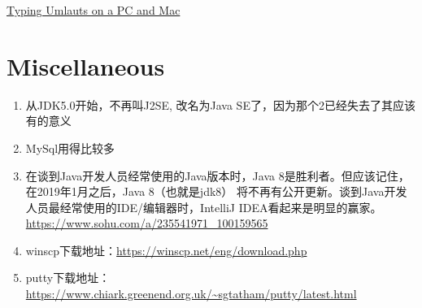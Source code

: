 \documentclass[a4paper, 12pt]{article}
\begin{document}
\href{http://www.nthuleen.com/teach/misc/typingumlauts.html}{Typing Umlauts on a PC and Mac}


\section{Miscellaneous}

\begin{enumerate}
\item 从JDK5.0开始，不再叫J2SE, 改名为Java SE了，因为那个2已经失去了其应该有的意义

\item MySql用得比较多

\item 在谈到Java开发人员经常使用的Java版本时，Java 8是胜利者。但应该记住，在2019年1月之后，Java 8（也就是jdk8） 将不再有公开更新。谈到Java开发人员最经常使用的IDE/编辑器时，IntelliJ IDEA看起来是明显的赢家。 \url{https://www.sohu.com/a/235541971_100159565}

\item winscp下载地址：\url{https://winscp.net/eng/download.php}

\item putty下载地址：\url{https://www.chiark.greenend.org.uk/~sgtatham/putty/latest.html}

\end{enumerate}
\end{document}
